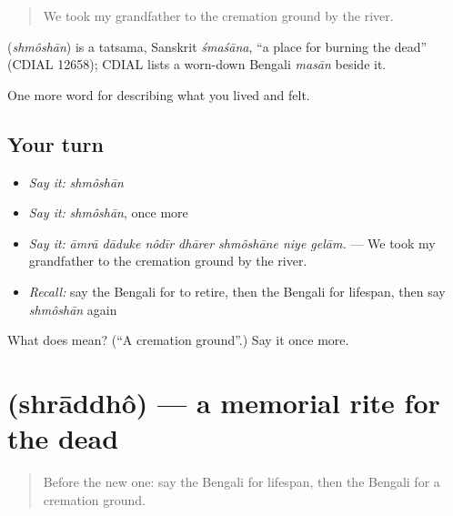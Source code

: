 \begin{quote}
We took my grandfather to the cremation ground by the river.
\end{quote}

\begin{cousinweb}
\textbf{} (\emph{shmôshān}) is a tatsama, Sanskrit \emph{śmaśāna}, \textquotedblleft{}a place for burning the dead\textquotedblright{} (CDIAL 12658); CDIAL lists a worn-down Bengali \emph{masān} beside it.
\end{cousinweb}

\begin{grammarlens}[title={What you've built}]
One more word for describing what you lived and felt.
\end{grammarlens}

\subsection*{Your turn}
\begin{itemize}
\raggedright
  \item \emph{Say it:} \emph{shmôshān}
  \item \emph{Say it:} \emph{shmôshān}, once more
  \item \emph{Say it:} \emph{āmrā dāduke nôdīr dhārer shmôshāne niye gelām.} — We took my grandfather to the cremation ground by the river.
  \item \emph{Recall:} say the Bengali for to retire, then the Bengali for lifespan, then say \emph{shmôshān} again
\end{itemize}

\begin{tcolorbox}[breakable,colback=teal!4,colframe=teal!35!black,title={Before you move on}]
What does  mean? (\textquotedblleft{}A cremation ground\textquotedblright{}.) Say it once more.
\end{tcolorbox}
\section[\texorpdfstring{\bn{শ্রাদ্ধ} (shrāddhô)}{শ্রাদ্ধ (shrāddhô)}]{ (shrāddhô) — a memorial rite for the dead}

\label{lesson:BN-C491-shraddho}



\begin{quote}
Before the new one: say the Bengali for lifespan, then the Bengali for a cremation ground.
\end{quote}

